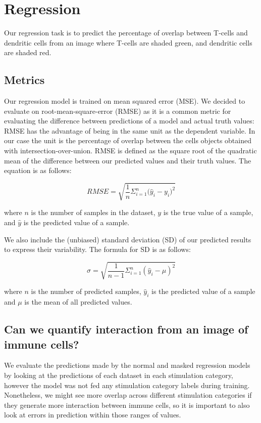 \section{Regression}

Our regression task is to predict the percentage of overlap between T-cells and dendritic cells from an image where T-cells are shaded green, and dendritic cells are shaded red.

\subsection{Metrics}

Our regression model is trained on mean squared error (MSE). We decided to evaluate on root-mean-square-error (RMSE) as it is a common metric for evaluating the difference between predictions of a model and actual truth values: RMSE has the advantage of being in the same unit as the dependent variable. In our case the unit is the percentage of overlap between the cells objects obtained with intersection-over-union. RMSE is defined as the square root of the quadratic mean of the difference between our predicted values and their truth values. The equation is as follows:

\begin{equation}
    RMSE = \sqrt{\frac{1}{n}{\Sigma_{i=1}^{n}{\Big({\hat{y}_i-y_i})}^2}}
\end{equation}

where $n$ is the number of samples in the dataset, $y$ is the true value of a sample, and $\hat{y}$ is the predicted value of a sample.

We also include the (unbiased) standard deviation (SD) of our predicted results to express their variability. The formula for SD is as follows:

\begin{equation}
    \sigma = \sqrt{\frac{1}{n-1}\Sigma_{i=1}^{n}{(\hat{y}_i - \mu)}^2}
\end{equation}

where $n$ is the number of predicted samples, $\hat{y}_i$ is the predicted value of a sample and $\mu$ is the mean of all predicted values.

\subsection{Can we quantify interaction from an image of immune cells?}

We evaluate the predictions made by the normal and masked regression models by looking at the predictions of each dataset in each stimulation category, however the model was not fed any stimulation category labels during training. Nonetheless, we might see more overlap across different stimulation categories if they generate more interaction between immune cells, so it is important to also look at errors in prediction within those ranges of values.

